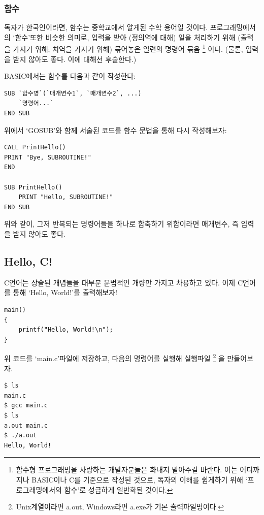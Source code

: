 \documentclass{article}
\begin{document}
\subsubsection{함수}

독자가 한국인이라면, 함수는 중학교에서 알게된 수학 용어일 것이다.
프로그래밍에서의 `함수'또한 비슷한 의미로,
입력을 받아 (정의역에 대해) 일을 처리하기 위해 (출력을 가지기 위해; 치역을 가지기 위해)
묶어놓은 일련의 명령어 묶음
\footnote{
    함수형 프로그래밍을 사랑하는 개발자분들은 화내지 말아주길 바란다.
    이는 어디까지나 BASIC이나 C를 기준으로 작성된 것으로,
    독자의 이해를 쉽게하기 위해 `프로그래밍에서의 함수'로 성급하게 일반화된 것이다.
}
이다. (물론, 입력을 받지 않아도 좋다. 이에 대해선 후술한다.)

BASIC에서는 함수를 다음과 같이 작성한다:

\begin{lstlisting}[escapeinside=``]
SUB `함수명`(`매개변수1`, `매개변수2`, ...)
    `명령어...`
END SUB
\end{lstlisting}

위에서 `GOSUB'와 함께 서술된 코드를 함수 문법을 통해 다시 작성해보자:

\begin{lstlisting}
CALL PrintHello()
PRINT "Bye, SUBROUTINE!"
END

SUB PrintHello()
    PRINT "Hello, SUBROUTINE!"
END SUB
\end{lstlisting}

위와 같이, 그저 반복되는 명령어들을 하나로 함축하기 위함이라면 매개변수,
즉 입력을 받지 않아도 좋다.

\subsection{Hello, C!}

C언어는 상술된 개념들을 대부분 문법적인 개량만 가지고 차용하고 있다.
이제 C언어를 통해 `Hello, World!'를 출력해보자!


\begin{lstlisting}
main()
{
    printf("Hello, World!\n");
}
\end{lstlisting}

위 코드를 `main.c'파일에 저장하고, 다음의 명령어를 실행해 실행파일
\footnote{
    Unix계열이라면 a.out, Windows라면 a.exe가 기본 출력파일명이다.
}
을 만들어보자.

\begin{lstlisting}[language=bash]
$ ls
main.c
$ gcc main.c
$ ls
a.out main.c
$ ./a.out
Hello, World!
\end{lstlisting}
\end{document}

